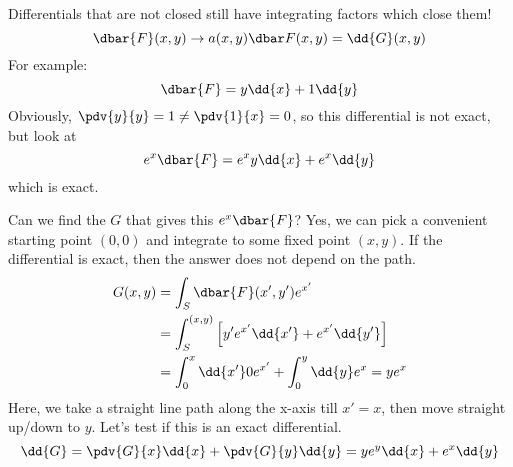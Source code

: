 \documentclass[a4paper,twoside,master.tex]{subfiles}
\begin{document}
Differentials that are not closed still have integrating factors which close them!
\begin{equation}
    \dbar{F}(x,y) \to a(x,y) \dbar F(x,y) = \dd{G}(x,y)
\end{equation}
For example:
\begin{equation}
    \dbar{F} = y \dd{x} + 1 \dd{y}
\end{equation}
Obviously, $ \pdv{y}{y} = 1 \neq \pdv{1}{x} = 0 $, so this differential is not exact, but look at
\begin{equation}
    e^{x} \dbar{F} = e^x y \dd{x} + e^x \dd{y}
\end{equation}
which is exact.

Can we find the $ G $ that gives this $ e^x \dbar{F} $? Yes, we can pick a convenient starting point $ (0,0) $ and integrate to some fixed point $ (x,y) $. If the differential is exact, then the answer does not depend on the path.
\begin{align}
    G(x,y) &= \int_S \dbar{F}(x',y') e^{x'} \\
    &= \int_S^{(x,y)} \left[ y' e^{x'} \dd{x'} + e^{x'} \dd{y'} \right] \\
    &= \int_0^x \dd{x'} 0 e^{x'} + \int_0^y \dd{y} e^x = y e^x
\end{align}
Here, we take a straight line path along the x-axis till $ x' = x $, then move straight up/down to $ y $. Let's test if this is an exact differential.
\begin{equation}
    \dd{G} = \pdv{G}{x} \dd{x} + \pdv{G}{y} \dd{y} = y e^y \dd{x} + e^x \dd{y}
\end{equation}
\end{document}
